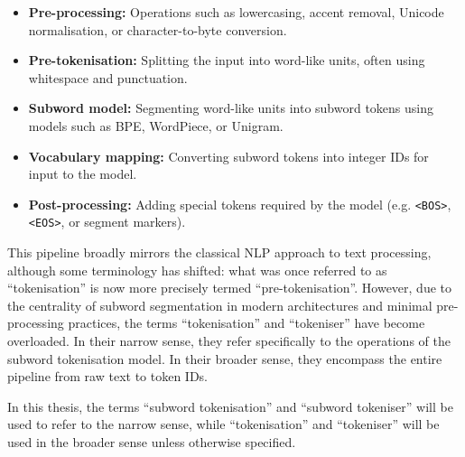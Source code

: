 \begin{itemize}
\item \textbf{Pre-processing:} Operations such as lowercasing, accent removal, Unicode normalisation, or character-to-byte conversion.
\item \textbf{Pre-tokenisation:} Splitting the input into word-like units, often using whitespace and punctuation.
\item \textbf{Subword model:} Segmenting word-like units into subword tokens using models such as BPE, WordPiece, or Unigram.
\item \textbf{Vocabulary mapping:} Converting subword tokens into integer IDs for input to the model.
\item \textbf{Post-processing:} Adding special tokens required by the model (e.g. \texttt{<BOS>}, \texttt{<EOS>}, or segment markers).
\end{itemize}

This pipeline broadly mirrors the classical NLP approach to text processing, although some terminology has shifted: what was once referred to as ``tokenisation'' is now more precisely termed ``pre-tokenisation''. However, due to the centrality of subword segmentation in modern architectures and minimal pre-processing practices, the terms ``tokenisation'' and ``tokeniser'' have become overloaded. In their narrow sense, they refer specifically to the operations of the subword tokenisation model. In their broader sense, they encompass the entire pipeline from raw text to token IDs.

In this thesis, the terms ``subword tokenisation'' and ``subword tokeniser'' will be used to refer to the narrow sense, while ``tokenisation'' and ``tokeniser'' will be used in the broader sense unless otherwise specified.


